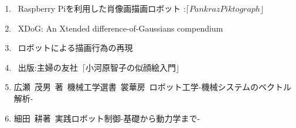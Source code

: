 \documentclass[a4j]{jarticle}			%
\begin{document}
\begin{multicols}{2}
\begin{enumerate}
\item {}\rbrack \ Raspberry Piを利用した肖像画描画ロボット :$ \lceil Pankraz Piktograph \rfloor$ \\
\item {}\rbrack \ XDoG: An Xtended difference-of-Gaussians compendium \\
\item {}\rbrack \ ロボットによる描画行為の再現\\
\item {}\rbrack \ 出版:主婦の友社\ $\lceil \text{小河原智子の似顔絵入門} \rfloor$\\
\item 広瀬\ 茂男\ 著\ 機械工学選書\ 裳華房\ ロボット工学-機械システムのベクトル解析-\\
\item 細田\ 耕著\ 実践ロボット制御-基礎から動力学まで- \\
\end{enumerate}

\end{multicols}
\end{document}
